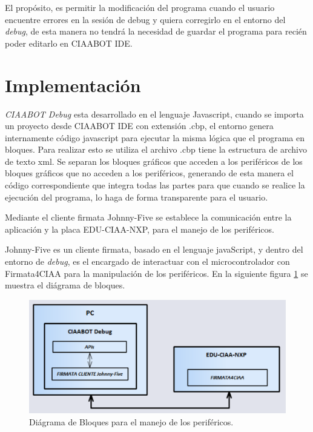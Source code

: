 El propósito, es permitir la modificación del programa cuando el usuario encuentre errores en la sesión de debug y quiera corregirlo en el entorno del \emph{debug}, de esta manera no tendrá la necesidad de guardar el programa para recién poder editarlo en CIAABOT IDE.


\section{Implementación}
\label{sec:Implementación}

\emph{CIAABOT Debug} esta desarrollado en el lenguaje Javascript, cuando se importa un proyecto desde CIAABOT IDE con extensión .cbp, el entorno genera internamente código javascript para ejecutar la misma lógica que el programa en bloques. 
Para realizar esto se utiliza el archivo .cbp tiene la estructura de archivo de texto xml. Se separan los bloques gráficos que acceden a los periféricos de los bloques gráficos que no acceden a los periféricos, generando de esta manera el código correspondiente que integra todas las partes para que cuando se realice la ejecución del programa, lo haga de forma transparente para el usuario.

Mediante el cliente firmata Johnny-Five se establece la comunicación entre la aplicación y la placa EDU-CIAA-NXP, para el manejo de los periféricos. 

Johnny-Five es un cliente firmata, basado en el lenguaje javaScript, y dentro del entorno de \emph{debug}, es el encargado de interactuar con el microcontrolador con Firmata4CIAA para la manipulación de los periféricos.
En la siguiente figura \ref{fig:diagrama-bloques} se muestra el diágrama de bloques.

\begin{figure}[!htbp]
	\centering
	\includegraphics*[width=13cm]{./Figures/diagrama-bloques-2.PNG}
	\caption{Diágrama de Bloques para el manejo de los periféricos.}
	\par\label{fig:diagrama-bloques}
\end{figure}

